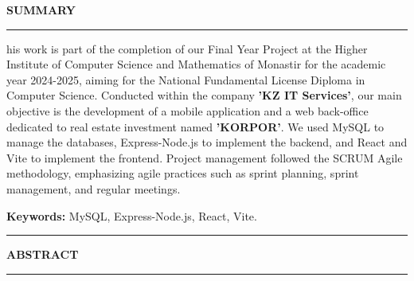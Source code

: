 \thispagestyle{empty} %

\begin{center}
{\color{primary}\Large\textbf{\MakeUppercase{Summary}}}
\end{center}
\vspace{0.1cm}
\begin{center}
\rule{0.6\textwidth}{1pt}
\end{center}
\vspace{0.5cm}

\noindent {}his work is part of the completion of our Final Year Project at the Higher Institute of Computer Science and Mathematics of Monastir for the academic year 2024-2025, aiming for the National Fundamental License Diploma in Computer Science. Conducted within the company \textbf{\textcolor{primary}{'KZ IT Services'}}, our main objective is the development of a mobile application and a web back-office dedicated to real estate investment named \textbf{\textcolor{primary}{'KORPOR'}}. We used MySQL to manage the databases, Express-Node.js to implement the backend, and React and Vite to implement the frontend. Project management followed the SCRUM Agile methodology, emphasizing agile practices such as sprint planning, sprint management, and regular meetings.

\vspace{0.3cm}
\begin{tcolorbox}[
    colback=background,
    colframe=primary,
    arc=1mm,
    boxrule=0.5pt,
    left=8pt,
    right=8pt,
    top=4pt,
    bottom=4pt,
    width=\textwidth
]
\textbf{Keywords:} MySQL, Express-Node.js, React, Vite.
\end{tcolorbox}

\vspace{1.2cm} %

\begin{center}
\textcolor{secondary}{\rule{0.7\textwidth}{0.5pt}}
\end{center}

\vspace{1.2cm}

\begin{center}
{\color{primary}\Large\textbf{\MakeUppercase{Abstract}}}
\end{center}
\vspace{0.1cm}
\begin{center}
\rule{0.6\textwidth}{1pt}
\end{center}
\vspace{0.5cm}

